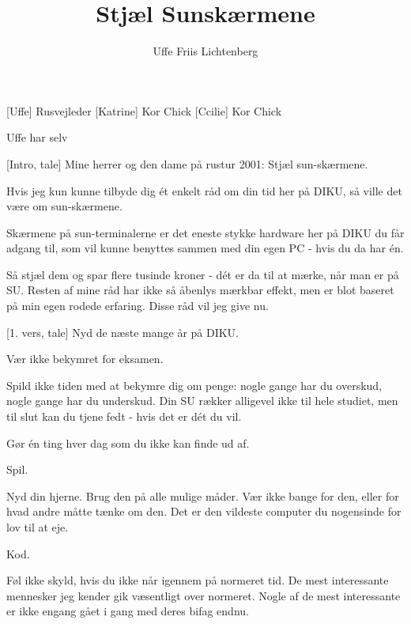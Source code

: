 \documentclass[a4paper,12pt]{article}
\title{Stjæl Sunskærmene}
\author{Uffe Friis Lichtenberg}
\begin{document}
\maketitle

\begin{sketch}

\begin{roles}
  [Uffe] Rusvejleder
  [Katrine] Kor Chick
  [Ccilie] Kor Chick
\end{roles}

\begin{props}
   Uffe har selv
\end{props}

\begin{noindent}

[Intro, tale] Mine herrer og den dame på rustur 2001:
        Stjæl sun-skærmene.
        
 Hvis jeg kun kunne tilbyde dig ét enkelt råd om din tid her på DIKU, så ville det være om sun-skærmene.
        
 Skærmene på sun-terminalerne er det eneste stykke hardware her
        på DIKU du får adgang til, som vil kunne benyttes sammen med
        din egen PC - hvis du da har én.
        
 Så stjæl dem og spar flere tusinde kroner - dét er da til at mærke, når man er på SU.
        Resten af mine råd har ikke så åbenlys mærkbar effekt, men er blot baseret på min egen rodede erfaring.
        Disse råd vil jeg give nu.


[1. vers, tale] Nyd de næste mange år på DIKU.

 Vær ikke bekymret for eksamen.

 Spild ikke tiden med at bekymre dig om penge:
        nogle gange har du overskud,
        nogle gange har du underskud.
        Din SU rækker alligevel ikke til hele studiet,
        men til slut kan du tjene fedt
        - hvis det er dét du vil.

 Gør én ting hver dag som du ikke kan finde ud af.

 Spil.

 Nyd din hjerne.
        Brug den på alle mulige måder.
        Vær ikke bange for den, eller for hvad andre måtte tænke om den.
        Det er den vildeste computer du nogensinde for lov til at eje.

 Kod.
        
 Føl ikke skyld, hvis du ikke når igennem på normeret tid.
        De mest interessante mennesker jeg kender gik væsentligt over normeret.
        Nogle af de mest interessante er ikke engang gået i gang med deres bifag endnu.


\end{noindent}
\end{sketch}
\end{document}
